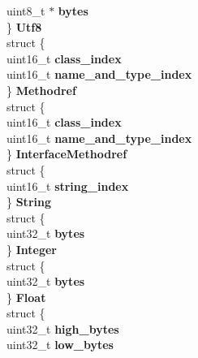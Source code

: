 \begin{DoxyCompactItemize}
{\begin{tabbing}
{{{{{{{{{{\hypertarget{structcp__info_1_1@0_1_1@4_a34c1da9248b884af89b5c91d55087100}{\>\>uint8\_t $\ast$ {\bfseries bytes}\\
\>\} {\bfseries Utf8}\\
\hypertarget{unioncp__info_1_1@0_ab2261015ed3a3022e93a195a9e7322a1}{\>struct \{\\
\hypertarget{structcp__info_1_1@0_1_1@5_ab2b48e96f2178c47f9f6b683c9b2fc59}{\>\>uint16\_t {\bfseries class\_index}\\
\hypertarget{structcp__info_1_1@0_1_1@5_ad7a8733b3b078818a59cc33eb1fa7dc3}{\>\>uint16\_t {\bfseries name\_and\_type\_index}\\
\>\} {\bfseries Methodref}\\
\hypertarget{unioncp__info_1_1@0_a0f528599a4fb684175bb3717f4485bc5}{\>struct \{\\
\hypertarget{structcp__info_1_1@0_1_1@6_ab2b48e96f2178c47f9f6b683c9b2fc59}{\>\>uint16\_t {\bfseries class\_index}\\
\hypertarget{structcp__info_1_1@0_1_1@6_ad7a8733b3b078818a59cc33eb1fa7dc3}{\>\>uint16\_t {\bfseries name\_and\_type\_index}\\
\>\} {\bfseries InterfaceMethodref}\\
\hypertarget{unioncp__info_1_1@0_a104db0a5981bc3281a0579664c8bab1f}{\>struct \{\\
\hypertarget{structcp__info_1_1@0_1_1@7_aa63dfc7668d7eff682f88b09c48eddc8}{\>\>uint16\_t {\bfseries string\_index}\\
\>\} {\bfseries String}\\
\hypertarget{unioncp__info_1_1@0_aa22cef451c3e99c919a40a2d4881436a}{\>struct \{\\
\hypertarget{structcp__info_1_1@0_1_1@8_a34ed0f597e452fbeb97cb0f551a678bb}{\>\>uint32\_t {\bfseries bytes}\\
\>\} {\bfseries Integer}\\
\hypertarget{unioncp__info_1_1@0_aca5b0fc1674ca54c043664d4e2c4ef9d}{\>struct \{\\
\hypertarget{structcp__info_1_1@0_1_1@9_a34ed0f597e452fbeb97cb0f551a678bb}{\>\>uint32\_t {\bfseries bytes}\\
\>\} {\bfseries Float}\\
\hypertarget{unioncp__info_1_1@0_af820af07d14f0e2766bcbabd1de859ea}{\>struct \{\\
\hypertarget{structcp__info_1_1@0_1_1@10_ae3858dffc80b9cda456040e27ea19cfe}{\>\>uint32\_t {\bfseries high\_bytes}\\
\hypertarget{structcp__info_1_1@0_1_1@10_aaafd386722f592c8821e682e4e3718b4}{\>\>uint32\_t {\bfseries low\_bytes}\\
}}}}}}}}}}}}}}}}}}}}}}}}}}
\end{tabbing}}
\end{DoxyCompactItemize}
